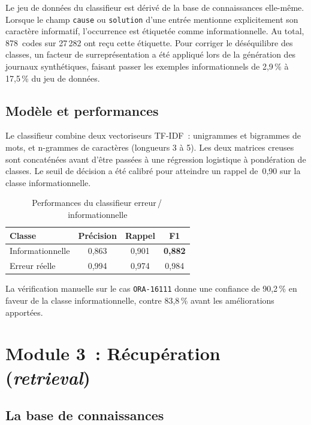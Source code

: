 \documentclass[12pt,a4paper]{report}
\begin{document}
Le jeu de donn\'ees du classifieur est d\'eriv\'e de la base de connaissances elle-m\^eme.
Lorsque le champ \texttt{cause} ou \texttt{solution} d'une entr\'ee mentionne
explicitement son caract\`ere informatif, l'occurrence est \'etiquet\'ee comme
informationnelle. Au total, 878~codes sur 27\,282 ont re\c cu cette \'etiquette.
Pour corriger le d\'es\'equilibre des classes, un facteur de surrepr\'esentation a
\'et\'e appliqu\'e lors de la g\'en\'eration des journaux synth\'etiques, faisant passer
les exemples informationnels de 2,9\,\% \`a 17,5\,\% du jeu de donn\'ees.

\subsection{Mod\`ele et performances}

Le classifieur combine deux vectoriseurs TF-IDF~: unigrammes et bigrammes de mots,
et n-grammes de caract\`eres (longueurs 3 \`a 5). Les deux matrices creuses sont
concat\'en\'ees avant d'\^etre pass\'ees \`a une r\'egression logistique \`a pond\'eration
de classes. Le seuil de d\'ecision a \'et\'e calibr\'e pour atteindre un rappel
de~0,90 sur la classe informationnelle.

\begin{table}[H]
  \centering
  \caption{Performances du classifieur erreur\,/\,informationnelle}
  \label{tab:classif_perf}
  \begin{tabular}{lccc}
    \toprule
    \textbf{Classe} & \textbf{Pr\'ecision} & \textbf{Rappel} & \textbf{F1} \\
    \midrule
    Informationnelle & 0,863 & 0,901 & \textbf{0,882} \\
    Erreur r\'eelle  & 0,994 & 0,974 & 0,984 \\
    \bottomrule
  \end{tabular}
\end{table}

La v\'erification manuelle sur le cas \texttt{ORA-16111} donne une confiance de
90,2\,\% en faveur de la classe informationnelle, contre 83,8\,\% avant les
am\'eliorations apport\'ees.

\section{Module 3~: R\'ecup\'eration (\emph{retrieval})}

\subsection{La base de connaissances}
\end{document}
